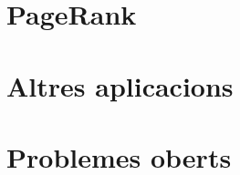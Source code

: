 \documentclass[aspectratio=169, 12pt]{beamer}
\begin{document}
\section{PageRank}

\section{Altres aplicacions}

\section{Problemes oberts}
\end{document}
